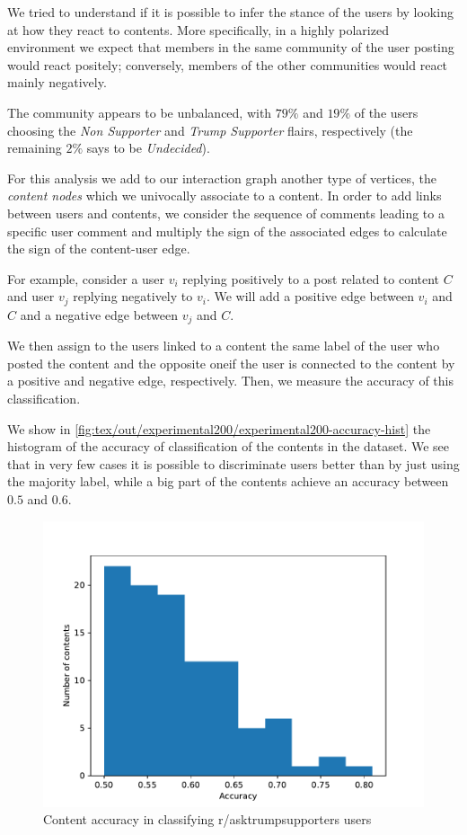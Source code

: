 We tried to understand if it is possible to infer the stance of the
users by looking at how they react to contents. More specifically, in a highly
polarized environment we expect that members in the same community of the user
posting would react positely; conversely, members of the other communities
would react mainly negatively.

The community appears to be unbalanced, with $79\%$ and $19\%$ of the users choosing the
\emph{Non Supporter} and \emph{Trump Supporter} flairs, respectively (the
remaining $2\%$ says to be \emph{Undecided}).

\bigskip

For this analysis we add to our interaction graph another type of vertices, the
\emph{content nodes} which we univocally associate to a content. In order to
add links between users and contents, we consider the sequence of comments
leading to a specific user comment and multiply the sign of the
associated edges to calculate the sign of the content-user edge.

For example, consider a user $v_i$
replying positively to a post related to content $C$ and user $v_j$ replying
negatively to $v_i$. We will add a positive edge between $v_i$ and $C$ and a
negative edge between $v_j$ and $C$.

We then assign to the users linked to a content the same label of the user who
posted the content and the opposite one\footnotemark if the user is connected to the content
by a positive and negative edge, respectively. Then, we measure the accuracy of
this classification.


We show in \autoref{fig:tex/out/experimental200/experimental200-accuracy-hist}
the histogram of the accuracy of classification of the contents in the dataset.
We see that in very few cases it is possible to discriminate users better than
by just using the majority label, while a big part of the contents achieve an
accuracy between $0.5$ and $0.6$.

\begin{figure}
	\centering
	\includegraphics[width=0.6\linewidth]{tex/out/experimental200/experimental200-accuracy-hist.pdf}
	\caption{Content accuracy in classifying r/asktrumpsupporters users}%
	\label{fig:tex/out/experimental200/experimental200-accuracy-hist}
\end{figure}

